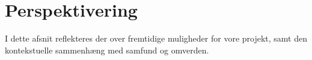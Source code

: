 \section{Perspektivering}
I dette afsnit reflekteres der over fremtidige muligheder for vore projekt, samt den kontekstuelle sammenhæng med samfund og omverden.